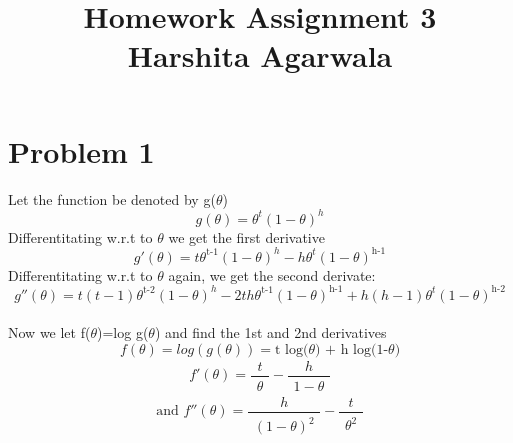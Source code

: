 \documentclass[11pt, a4paper, fleqn]{article}
\begin{document}
\title{Homework Assignment 3\\
Harshita Agarwala}
\maketitle
\section{Problem 1}
Let the function be denoted by g($\theta$)
\begin{equation*}
g(\theta)=\theta^t (1-\theta)^h
\end{equation*}
Differentitating w.r.t to $\theta$ we get the first derivative
\begin{equation*}
g'(\theta)=t \theta^\text{t-1} (1-\theta)^h - h \theta^t (1 - \theta)^\text{h-1}
\end{equation*}
Differentitating w.r.t to $\theta$ again, we get the second derivate:
\begin{equation*}
g''(\theta)=t(t-1) \theta^\text{t-2} (1-\theta)^h -2th \theta^\text{t-1} (1 - \theta)^\text{h-1} + h(h-1) \theta^t (1 - \theta)^\text{h-2}
\end{equation*}
\\
Now we let f($\theta$)=log g($\theta$) and find the 1st and 2nd derivatives
\begin{equation*}
f(\theta) = log (g(\theta)) = \text{t log($\theta$) + h log(1-$\theta$)}
\end{equation*}
\begin{equation*}
f'(\theta) = 
\frac{\substack{t}}{\substack{\theta}} - \frac{\substack{h}}{\substack{1 - \theta}} 
\end{equation*}
\begin{equation*}
\text{and  }
f''(\theta) = 
\frac{\substack{h}}{\substack{(1 - \theta)^2}} - \frac{\substack{t}}{\substack{\theta^2}}
\end{equation*}
\end{document}
